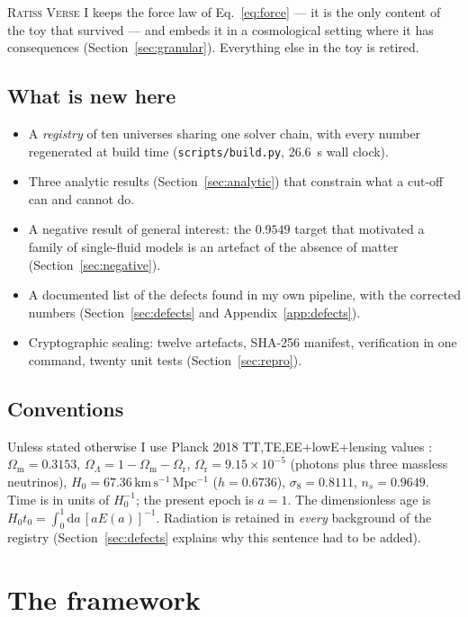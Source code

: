 \documentclass[11pt,a4paper]{article}
\theoremstyle{definition}
\newcommand{\Omm}{\Omega_{\mathrm{m}}}
\newcommand{\Omr}{\Omega_{\mathrm{r}}}
\newcommand{\OmL}{\Omega_{\Lambda}}
\newcommand{\Hzt}{H_0 t_0}
\newcommand{\kms}{\,\mathrm{km\,s^{-1}\,Mpc^{-1}}}
\begin{document}
\textsc{Ratiss Verse I} keeps the force law of Eq.~\eqref{eq:force} --- it is
the only content of the toy that survived --- and embeds it in a cosmological
setting where it has consequences (Section~\ref{sec:granular}). Everything
else in the toy is retired.

\subsection{What is new here}

\begin{itemize}
\item A \emph{registry} of ten universes sharing one solver chain, with every
      number regenerated at build time
      (\texttt{scripts/build.py}, 26.6~s wall clock).
\item Three analytic results (Section~\ref{sec:analytic}) that constrain what
      a cut-off can and cannot do.
\item A negative result of general interest: the $0.9549$ target that
      motivated a family of single-fluid models is an artefact of the absence
      of matter (Section~\ref{sec:negative}).
\item A documented list of the defects found in my own pipeline, with the
      corrected numbers
      (Section~\ref{sec:defects} and Appendix~\ref{app:defects}).
\item Cryptographic sealing: twelve artefacts, SHA-256 manifest, verification
      in one command, twenty unit tests
      (Section~\ref{sec:repro}).
\end{itemize}

\subsection{Conventions}

Unless stated otherwise I use Planck 2018 TT,TE,EE+lowE+lensing values
\cite{planck2018}: $\Omm = 0.3153$, $\OmL = 1-\Omm-\Omr$, $\Omr = 9.15\times
10^{-5}$ (photons plus three massless neutrinos), $H_0 = 67.36\kms$
($h = 0.6736$), $\sigma_8 = 0.8111$, $n_s = 0.9649$.
Time is in units of $H_0^{-1}$; the present epoch is $a = 1$.
The dimensionless age is $\Hzt = \int_0^1 \mathrm{d}a\,[aE(a)]^{-1}$.
Radiation is retained in \emph{every} background of the registry
(Section~\ref{sec:defects} explains why this sentence had to be added).

\section{The framework}
\label{sec:framework}
\end{document}
